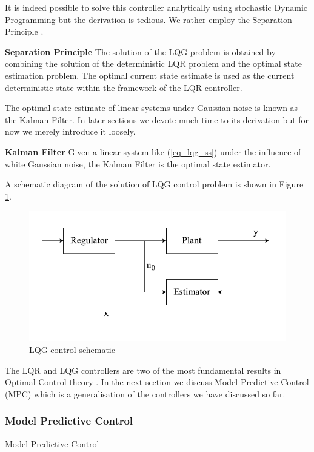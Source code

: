 \documentclass[../masters.tex]{subfiles}
\begin{document}
It is indeed possible to solve this controller analytically using stochastic Dynamic Programming but the derivation is tedious. We rather employ the Separation Principle \cite{lqg}.
\begin{defn}
\textbf{Separation Principle} The solution of the LQG problem is obtained by combining the solution of the deterministic LQR problem and the optimal state estimation problem. The optimal current state estimate is used as the current deterministic state within the framework of the LQR controller. 
\end{defn}
The optimal state estimate of linear systems under Gaussian noise is known as the Kalman Filter. In later sections we devote much time to its derivation but for now we merely introduce it loosely.
\begin{defn}
\textbf{Kalman Filter} Given a linear system like (\ref{eq_lqg_ss}) under the influence of white Gaussian noise, the Kalman Filter is the optimal state estimator.
\end{defn}
A schematic diagram of the solution of LQG control problem is shown  in Figure \ref{fig_lqg}.
\begin{figure}[H] 
\centering
\includegraphics[scale=1.0]{LQG.pdf}
\caption{LQG control schematic}
\label{fig_lqg}
\end{figure}
The LQR and LQG controllers are two of the most fundamental results in Optimal Control theory \cite{robust}. In the next section we discuss Model Predictive Control (MPC) which is a generalisation of the controllers we have discussed so far.

\subsubsection{Model Predictive Control}
Model Predictive Control








\end{document}

